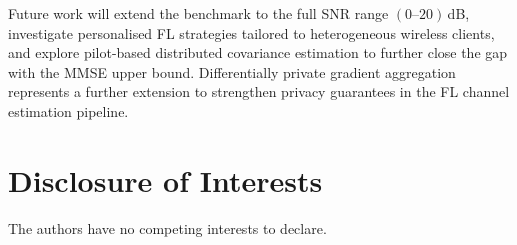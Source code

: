 \documentclass[runningheads]{llncs}
\begin{document}
Future work will extend the benchmark to the full SNR range
$(0\text{--}20)$\,dB, investigate personalised FL strategies tailored to
heterogeneous wireless clients, and explore pilot-based distributed
covariance estimation to further close the gap with the MMSE upper
bound.  Differentially private gradient aggregation represents a further
extension to strengthen privacy guarantees in the FL channel estimation
pipeline.

\section*{Disclosure of Interests}

The authors have no competing interests to declare.



\end{document}
